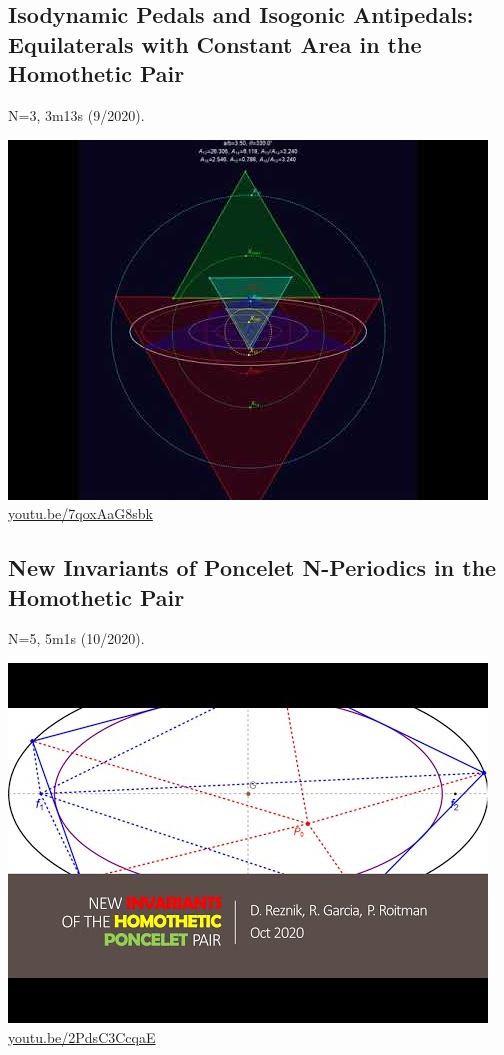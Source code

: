 \documentclass[12pt]{amsart}
\begin{document}
\subsection{Isodynamic Pedals and Isogonic Antipedals: Equilaterals with Constant Area in the Homothetic Pair}
\label{vid:7qoxAaG8sbk}
\noindent N=3, 3m13s (9/2020). 
\begin{center}\includegraphics[width=.5\textwidth]{pics/7qoxAaG8sbk.jpg} \\ 
\href{https://youtu.be/7qoxAaG8sbk}{\url{youtu.be/7qoxAaG8sbk}}\end{center}
% 

\subsection{New Invariants of Poncelet N-Periodics in the Homothetic Pair}
\label{vid:2PdsC3CcqaE}
\noindent N=5, 5m1s (10/2020). 
\begin{center}\includegraphics[width=.5\textwidth]{pics/2PdsC3CcqaE.jpg} \\ 
\href{https://youtu.be/2PdsC3CcqaE}{\url{youtu.be/2PdsC3CcqaE}}\end{center}
% 
\end{document}
